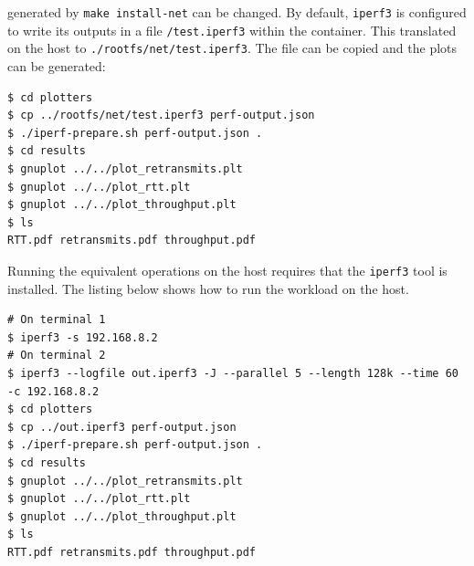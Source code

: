 generated by \verb|make install-net| can be changed.
By default, \verb|iperf3| is configured to write its outputs in a file \verb|/test.iperf3| within 
the container. This translated on the host to \verb|./rootfs/net/test.iperf3|. The file can be copied 
and the plots can be generated:
\begin{lstlisting}[label={code:implementation/benchmark/network-plotgen-container}, style=bash, caption={}]
$ cd plotters
$ cp ../rootfs/net/test.iperf3 perf-output.json 
$ ./iperf-prepare.sh perf-output.json .
$ cd results 
$ gnuplot ../../plot_retransmits.plt 
$ gnuplot ../../plot_rtt.plt 
$ gnuplot ../../plot_throughput.plt 
$ ls 
RTT.pdf retransmits.pdf throughput.pdf
\end{lstlisting}
Running the equivalent operations on the host requires that the \verb|iperf3| tool is installed.
The listing below shows how to run the workload on the host.
\begin{lstlisting}[label={code:implementation/benchmark/network-plotgen-host}, style=bash, caption={}]
# On terminal 1
$ iperf3 -s 192.168.8.2
# On terminal 2 
$ iperf3 --logfile out.iperf3 -J --parallel 5 --length 128k --time 60 -c 192.168.8.2
$ cd plotters
$ cp ../out.iperf3 perf-output.json 
$ ./iperf-prepare.sh perf-output.json .
$ cd results 
$ gnuplot ../../plot_retransmits.plt 
$ gnuplot ../../plot_rtt.plt 
$ gnuplot ../../plot_throughput.plt 
$ ls 
RTT.pdf retransmits.pdf throughput.pdf
\end{lstlisting}

